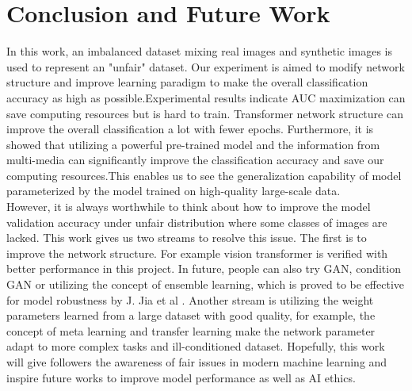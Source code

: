 \documentclass[10pt,twocolumn,letterpaper]{article}
\begin{document}
\section{Conclusion and Future Work}
In this work, an imbalanced dataset mixing real images and synthetic images is used to represent an "unfair" dataset. Our experiment is aimed to modify network structure and improve learning paradigm to make the overall classification accuracy as high as possible.Experimental results indicate AUC maximization can save computing resources but is hard to train. Transformer network structure can improve the overall classification a lot with fewer epochs. Furthermore, it is showed that utilizing a powerful pre-trained model and the information from multi-media can significantly improve the classification accuracy and save our computing resources.This enables us to see the generalization capability of model parameterized by the model trained on high-quality large-scale data.\\
However, it is always worthwhile to think about how to improve the model validation accuracy under unfair distribution where some classes of images are lacked. This work gives us two streams to resolve this issue. The first is to improve the network structure. For example vision transformer is verified with better performance in this project. In future, people can also try GAN\cite{goodfellow2014generative}, condition GAN\cite{mirza2014conditional} or utilizing the concept of ensemble learning, which is proved to be effective for model robustness by J. Jia et al\cite{DBLP:journals/corr/abs-2008-04495} . Another stream is utilizing the weight parameters learned from a large dataset with good quality, for example, the concept of meta learning \cite{DBLP:journals/corr/FinnAL17} and transfer learning \cite{DBLP:journals/corr/abs-1911-02685} make the network parameter adapt to more complex tasks and ill-conditioned dataset. Hopefully, this work will give followers the awareness of fair issues in modern machine learning and inspire future works to improve model performance as well as AI ethics.





{\small


}
\end{document}
